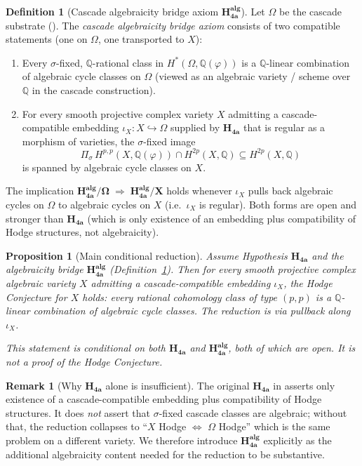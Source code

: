 \documentclass[11pt, a4paper]{amsart}
\newtheorem{proposition}[theorem]{Proposition}
\theoremstyle{definition}
\newtheorem{definition}[theorem]{Definition}
\newtheorem{remark}[theorem]{Remark}
\newcommand{\Q}{\mathbb{Q}}
\begin{document}
\begin{definition}[Cascade algebraicity bridge axiom $\mathbf{H_{4a}^{alg}}$]\label{def:H4aalg}
Let $\Omega$ be the cascade substrate
(\cite[\S\,$\Omega$]{CascadeFoundations}). The
\emph{cascade algebraicity bridge axiom} consists of two
compatible statements (one on $\Omega$, one transported to $X$):
\begin{enumerate}
\item[$\mathbf{H_{4a}^{alg}\!\!/\Omega}$:] Every $\sigma$-fixed,
$\Q$-rational class in $H^*(\Omega, \Q(\varphi))$ is a
$\Q$-linear combination of algebraic cycle classes on $\Omega$
(viewed as an algebraic variety / scheme over $\Q$ in the cascade
construction).
\item[$\mathbf{H_{4a}^{alg}\!\!/X}$:] For every smooth projective
complex variety $X$ admitting a cascade-compatible embedding
$\iota_X: X \hookrightarrow \Omega$ supplied by $\mathbf{H_{4a}}$
that is regular as a morphism of varieties, the $\sigma$-fixed image
\[
\Pi_\sigma\, H^{p,p}(X,\Q(\varphi)) \cap H^{2p}(X,\Q)
   \subseteq H^{2p}(X,\Q)
\]
is spanned by algebraic cycle classes on $X$.
\end{enumerate}
The implication
$\mathbf{H_{4a}^{alg}\!\!/\Omega}\;\Longrightarrow\;
\mathbf{H_{4a}^{alg}\!\!/X}$ holds whenever $\iota_X$ pulls back
algebraic cycles on $\Omega$ to algebraic cycles on $X$ (i.e.\
$\iota_X$ is regular). Both forms are open and stronger than
$\mathbf{H_{4a}}$ (which is only existence of an embedding plus
compatibility of Hodge structures, not algebraicity).
\end{definition}

\begin{proposition}[Main conditional reduction]
\label{thm:main-cond}
Assume Hypothesis $\mathbf{H_{4a}}$
\cite[\S H${}_{4a}$]{CascadeFoundations} \emph{and} the algebraicity
bridge $\mathbf{H_{4a}^{alg}}$ (Definition~\ref{def:H4aalg}). Then
for every smooth projective complex algebraic variety $X$ admitting
a cascade-compatible embedding $\iota_X$, the Hodge Conjecture for
$X$ holds: every rational cohomology class of type $(p,p)$ is a
$\Q$-linear combination of algebraic cycle classes. The reduction
is via pullback along $\iota_X$.

\emph{This statement is conditional on both $\mathbf{H_{4a}}$ and
$\mathbf{H_{4a}^{alg}}$, both of which are open. It is not a proof
of the Hodge Conjecture.}
\end{proposition}

\begin{remark}[Why $\mathbf{H_{4a}}$ alone is insufficient]\label{rmk:H4a_alone}
The original $\mathbf{H_{4a}}$ in
\cite[\S H${}_{4a}$]{CascadeFoundations} asserts only existence of
a cascade-compatible embedding plus compatibility of Hodge
structures. It does \emph{not} assert that $\sigma$-fixed cascade
classes are algebraic; without that, the reduction collapses to
``$X$ Hodge $\Leftrightarrow$ $\Omega$ Hodge'' which is the same
problem on a different variety. We therefore introduce
$\mathbf{H_{4a}^{alg}}$ explicitly as the additional algebraicity
content needed for the reduction to be substantive.
\end{remark}
\end{document}
